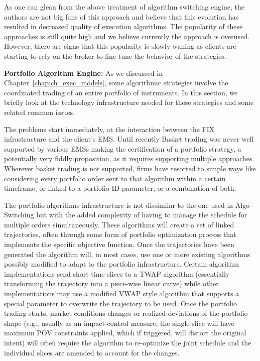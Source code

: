 As one can glean from the above treatment of algorithm switching engine, the authors are not big fans of this approach and believe that this evolution has resulted in decreased quality of execution algorithms. The popularity of these approaches is still quite high and we believe currently the approach is overused. However, there are signs that this popularity is slowly waning as clients are starting to rely on the broker to fine tune the behavior of the strategies. \twomedskip


\noindent\textbf{Portfolio Algorithm Engine:} As we discussed in Chapter~\ref{chap:ch_exec_models}, some algorithmic strategies involve the coordinated trading of an entire portfolio of instruments. In this section, we briefly look at the technology infrastructure needed for these strategies and some related common issues. 


The problems start immediately, at the interaction between the FIX infrastructure and the client's EMS. Until recently Basket trading was never well supported by various EMSs making the certification of a portfolio strategy, a potentially very fiddly proposition, as it requires supporting multiple approaches. Wherever basket trading is not supported, firms have resorted to simple ways like considering every portfolio order sent to that algorithm within a certain timeframe, or linked to a portfolio ID parameter, or a combination of both.


The portfolio algorithms infrastructure is not dissimilar to the one used in Algo Switching but with the added complexity  of having to manage the schedule for multiple orders simultaneously. These algorithms will create a set of linked trajectories, often through some form of portfolio optimization process that implements the specific objective function. Once the trajectories have been generated the algorithm will, in most cases, use one or more existing algorithms possibly modified to adapt to the portfolio infrastructure.  Certain algorithm implementations send short time slices to a TWAP algorithm (essentially transforming the trajectory into a piece-wise linear curve) while other implementations may use a modified VWAP style algorithm that supports a special parameter to overwrite the trajectory to be used. Once the portfolio trading starts, market conditions changes or realized deviations of the portfolio shape (e.g., usually as an impact-control measure, the single slice will have maximum POV constraints applied, which if triggered, will distort the original intent) will often require the algorithm to re-optimize the joint schedule and the individual slices are amended to account for the changes.


